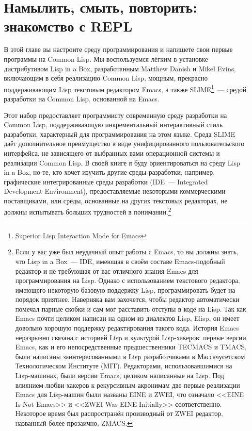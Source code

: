 \chapter{Намылить, смыть, повторить: знакомство с REPL}
\label{ch:02}

В этой главе вы настроите среду программирования и напишете свои первые программы на
Common Lisp. Мы воспользуемся лёгким в установке дистрибутивом Lisp in a Box,
разработанным Matthew Danish и Mikel Evins, включающим в себя реализацию
Common Lisp, мощным, прекрасно поддерживающим Lisp текстовым редактором Emacs, а
также SLIME\footnote{Superior Lisp Interaction Mode for Emacs}~--- средой
разработки на Common Lisp, основанной на Emacs.

Этот набор предоставляет программисту современную среду разработки на Common Lisp,
поддерживающую инкрементальный интерактивный стиль разработки, характерный для
программирования на этом языке. Среда SLIME даёт дополнительное преимущество в виде
унифицированного пользовательского интерфейса, не зависящего от выбранных вами
операционной системы и реализации Common Lisp. В своей книге я буду ориентироваться на
среду Lisp in a Box, но те, кто хочет изучить другие среды разработки, например,
графические интегрированные среды разработки (IDE~--- Integrated Development Environment),
предоставляемые некоторыми коммерческими поставщиками, или среды, основанные на других
текстовых редакторах, не должны испытывать больших трудностей в понимании.\footnote{Если у
  вас уже был неудачный опыт работы с Emacs, то вы должны знать, что Lisp in a Box~---
  IDE, имеющая в своём составе Emacs-подобный редактор и не требующая от вас отличного
  знания Emacs для программирования на Lisp. Однако с использованием текстового редактора,
  имеющего некоторую базовую поддержку Lisp, программировать будет на порядок
  приятнее. Наверняка вам захочется, чтобы редактор автоматически помечал парные скобки и
  сам мог расставить отступы в коде на Lisp. Так как Emacs почти целиком написан на одном
  из диалектов Lisp, Elisp, он имеет довольно хорошую поддержку редактирования такого
  кода. История Emacs неразрывно связана с историей Lisp и культурой Lisp-хакеров: первые
  версии Emacs, как и его непосредственные предшественники TECMACS и
  TMACS, были написаны заинтересованными в Lisp разработчиками в Массачусетском
  Технологическом Институте (MIT). Редакторами, использовавшимися на Lisp-машинах, были
  версии Emacs, целиком написанные на Lisp. Под влиянием любви хакеров к рекурсивным
  акронимам две первые реализации Emacs для Lisp-машин были названы EINE и
  ZWEI, что означало <<EINE Is Not Emacs>> и <<ZWEI Was EINE Initially>>
  соответственно. Некоторое время был распространён производный от ZWEI редактор,
  названный более прозаично, ZMACS.}

